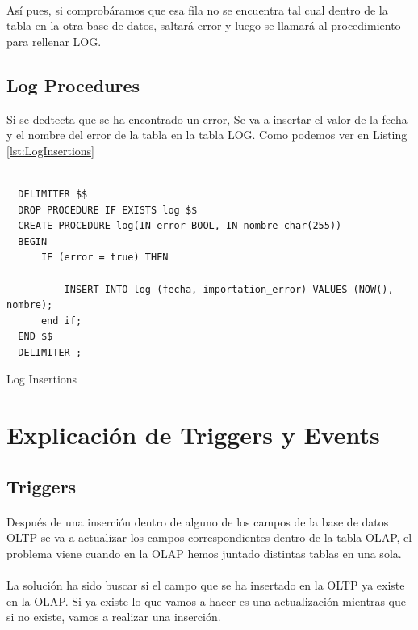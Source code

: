 \documentclass[a4paper 
,twoside
]{article}
\begin{document}
  \paragraph{}
  Así pues, si comprobáramos que esa fila no se encuentra tal cual dentro de la tabla en la otra base de datos, saltará error y luego se llamará al procedimiento para rellenar LOG.
  \subsection{Log Procedures}
  Si se dedtecta que se ha encontrado un error, Se va a insertar el valor de la fecha y el nombre del error de la tabla en la tabla LOG. Como podemos ver en Listing \ref{lst:LogInsertions}

  \begin{listing}[H]
    \begin{verbatim}

  DELIMITER $$
  DROP PROCEDURE IF EXISTS log $$
  CREATE PROCEDURE log(IN error BOOL, IN nombre char(255))
  BEGIN
      IF (error = true) THEN

          INSERT INTO log (fecha, importation_error) VALUES (NOW(), nombre);
      end if;
  END $$
  DELIMITER ;

    \end{verbatim}
    \caption{Log Insertions}
    \label{lst:LogInsertions}
  \end{listing}

\pagebreak
\section{Explicación de Triggers y Events}
  \subsection{Triggers}
    \paragraph{}
    Después de una inserción dentro de alguno de los campos de la base de datos OLTP se va a actualizar los campos correspondientes dentro de la tabla OLAP, el problema viene cuando en la OLAP hemos juntado distintas tablas en una sola.
    \paragraph{}
    La solución ha sido buscar si el campo que se ha insertado en la OLTP ya existe en la OLAP. Si ya existe lo que vamos a hacer es una actualización mientras que si no existe, vamos a realizar una inserción.
\end{document}

